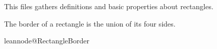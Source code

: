 

\makeatletter

\providecommand{\newleannode}[2]{%
  \expandafter\gdef\csname leannode@#1\endcsname{#2}}
\providecommand{\inputleannode}[1]{%
  \csname leannode@#1\endcsname}

\providecommand{\newleanmodule}[2]{%
  \expandafter\gdef\csname leanmodule@#1\endcsname{#2}}
\providecommand{\inputleanmodule}[1]{%
  \csname leanmodule@#1\endcsname}

\makeatother


\newleannode{RectangleBorder}{}

\newleanmodule{PrimeNumberTheoremAnd.Rectangle}{
This files gathers definitions and basic properties about rectangles.

The border of a rectangle is the union of its four sides.

\inputleannode{RectangleBorder}
}